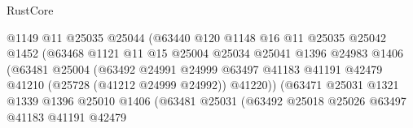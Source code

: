 \begin{lexlean}{RustCore}
\begin{coremodule}
                                        @1149
                                        @11
                                        @25035
                                        @25044
                                        (@63440
                                          @120
                                          @1148
                                          @16
                                          @11
                                          @25035
                                          @25042
                                          @1452
                                          (@63468
                                            @1121
                                            @11
                                            @15
                                            @25004
                                            @25034
                                            @25041
                                            @1396
                                            @24983
                                            @1406
                                            (@63481
                                              @25004
                                              (@63492
                                                @24991
                                                @24999
                                                @63497
                                                @41183
                                                @41191
                                                @42479
                                                @41210
                                                (@25728 (@41212 @24999 @24992))
                                                @41220))
                                            (@63471
                                              @25031
                                              @1321
                                              @1339
                                              @1396
                                              @25010
                                              @1406
                                              (@63481
                                                @25031
                                                (@63492
                                                  @25018
                                                  @25026
                                                  @63497
                                                  @41183
                                                  @41191
                                                  @42479

\end{coremodule}
\end{lexlean}
